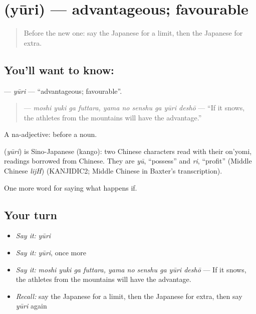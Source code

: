 \section[\texorpdfstring{\ja{ゆうり} (yūri)}{ゆうり (yūri)}]{ (yūri) — advantageous; favourable}

\label{lesson:JA-C532-yuuri}



\begin{quote}
Before the new one: say the Japanese for a limit, then the Japanese for extra.
\end{quote}

\subsection*{You'll want to know: }
\textbf{} — \emph{yūri} — \textquotedblleft{}advantageous; favourable\textquotedblright{}.

\begin{quote}
\textbf{    } — \emph{moshi yuki ga futtara, yama no senshu ga yūri deshō} — \textquotedblleft{}If it snows, the athletes from the mountains will have the advantage.\textquotedblright{}
\end{quote}

A na-adjective:  before a noun.

\begin{cousinweb}
\textbf{} (\emph{yūri}) is Sino-Japanese (kango): two Chinese characters read with their on'yomi, readings borrowed from Chinese. They are \emph{yū}, \textquotedblleft{}possess\textquotedblright{} and \emph{ri}, \textquotedblleft{}profit\textquotedblright{} (Middle Chinese \emph{lijH}) (KANJIDIC2; Middle Chinese in Baxter's transcription).
\end{cousinweb}

\begin{grammarlens}[title={What you've built}]
One more word for saying what happens if.
\end{grammarlens}

\subsection*{Your turn}
\begin{itemize}
\raggedright
  \item \emph{Say it:} \emph{yūri}
  \item \emph{Say it:} \emph{yūri}, once more
  \item \emph{Say it:} \emph{moshi yuki ga futtara, yama no senshu ga yūri deshō} — If it snows, the athletes from the mountains will have the advantage.
  \item \emph{Recall:} say the Japanese for a limit, then the Japanese for extra, then say \emph{yūri} again
\end{itemize}

